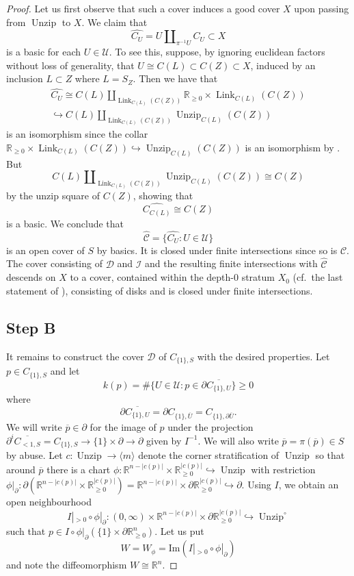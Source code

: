 \documentclass[11pt]{amsart}
\newcommand{\mcal}[1]{\mathcal{#1}}
\newcommand{\mrm}[1]{\mathrm{#1}}
\newcommand{\mbb}[1]{\mathbb{#1}}
\newcommand{\R}{\mbb{R}}
\DeclareMathOperator{\Unzip}{Unzip}
\DeclareMathOperator{\Link}{Link}
\numberwithin{equation}{section}
\theoremstyle{definition}
\theoremstyle{remark}
\theoremstyle{plain}
\begin{document}
\begin{proof}
    Let us first observe that such a cover induces a good cover $X$ upon passing from $\Unzip$ to $X$. We claim that 
    \[
        \widehat{C_{U}}=U\amalg_{\pi^{-1}U}C_{U}\subset X
    \]
    is a basic for each $U\in\mcal{U}$. To see this, suppose, by ignoring euclidean factors without loss of generality, that $U\cong C(L)\subset C(Z)\subset X$, induced by an inclusion $L\subset Z$ where $L=S_Z$. Then we have that 
    \begin{multline*}
        \widehat{C_U}\cong C(L)\amalg_{\Link_{C(L)}(C(Z))}\R_{\geq0}\times\Link_{C(L)}(C(Z))\\
        \hookrightarrow C(L)\amalg_{\Link_{C(L)}(C(Z))}\Unzip_{C(L)}(C(Z))
    \end{multline*} 
    is an isomorphism since the collar $\R_{\geq0}\times\Link_{C(L)}(C(Z))\hookrightarrow \Unzip_{C(L)}(C(Z))$ is an isomorphism by . But 
    \[
        C(L)\amalg_{\Link_{C(L)}(C(Z))}\Unzip_{C(L)}(C(Z))\cong C(Z)
    \]
    by the unzip square of $C(Z)$, showing that 
    \[
        \widehat{C_{C(L)}}\cong C(Z)
    \]
    is a basic. We conclude that 
    \[
        \widehat{\mcal{C}}=\{\widehat{C_U} : U\in\mcal{U}\}
    \]
    is an open cover of $S$ by basics. It is closed under finite intersections since so is $\mcal{C}$. The cover consisting of $\mcal{D}$ and $\mcal{I}$ and the resulting finite intersections with $\widehat{\mcal{C}}$ descends on $X$ to a cover, contained within the depth-$0$ stratum $X_0$ (cf.\ the last statement of \cite[Proposition 7.3.10]{ayala2017local}), consisting of disks and is closed under finite intersections. 

    \subsection*{Step B} It remains to construct the cover $\mcal{D}$ of $C_{\{1\},S}$ with the desired properties. Let $p\in C_{\{1\},S}$ and let 
    \[
        k(p)=\#\{U\in \mcal{U} : p\in\partial \overline{C_{\{1\},U}}\}\geq0
    \]
    where 
    \[
        \partial\overline{C_{\{1\},U}}=\partial C_{\{1\},\overline{U}}=C_{\{1\},\partial\overline{U}}.
    \]
    We will write $\overline{p}\in\partial$ for the image of $p$ under the projection $\partial^i\overline{C_{<1,S}}=C_{\{1\},S}\to \{1\}\times\partial\to\partial$ given by $I^{-1}$. We will also write $\overline{p}=\pi(\overline{p})\in S$ by abuse. Let $c\colon\Unzip\to \langle m \rangle$ denote the corner stratification of $\Unzip$ so that around $\overline{p}$ there is a chart $\phi\colon\R^{n-|c(p)|}\times\R_{\geq0}^{|c(p)|}\hookrightarrow \Unzip$ with restriction $\phi|_{\partial}\colon\partial(\R^{n-|c(p)|}\times\R_{\geq0}^{|c(p)|})=\R^{n-|c(p)|}\times\partial\R_{\geq0}^{|c(p)|}\hookrightarrow \partial$. Using $I$, we obtain an open neighbourhood 
    \[
        I|_{>0}\circ\phi|_{\partial}\colon (0,\infty)\times\R^{n-|c(p)|}\times\partial\R_{\geq0}^{|c(p)|}\hookrightarrow \Unzip^\circ
    \]
    such that $p\in I\circ\phi|_{\partial}(\{1\}\times\partial\R_{\geq0}^n)$. Let us put 
    \[
        W=W_\phi=\mrm{Im}(I|_{>0}\circ\phi|_{\partial})
    \] 
    and note the diffeomorphism $W\cong\R^n$. 


\end{proof}
\end{document}
